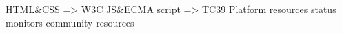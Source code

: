HTML&CSS   =>  W3C     JS&ECMA script        =>  TC39
Platform resources 
status monitors 
community resources 